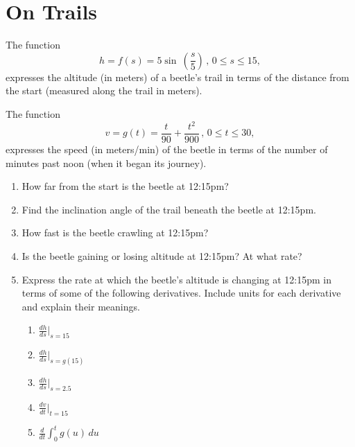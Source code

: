 \documentclass{ximera}
\begin{document}
\section{On Trails}

\begin{question} \label{QPPdreefr34}
The function
\[
  h = f(s)=5\sin\ \left(\frac{s}{5}\right)\, , \, 0\le s\leq 15,
\]
expresses the altitude (in meters) of a beetle's trail in terms of the distance from the start (measured along the trail in meters).

The function 
\[
     v = g(t) = \frac{t}{90} + \frac{t^2}{900} \, , \, 0\le t\leq 30,
\]
expresses the speed (in meters/min) of the beetle in terms of the number of minutes past noon (when it began its journey).

\begin{enumerate}

\item How far from the start is the beetle at 12:15pm?

\item Find the inclination angle of the trail beneath the beetle at 12:15pm.

\item How fast is the beetle crawling at 12:15pm?

\item Is the beetle gaining or losing altitude at 12:15pm? At what rate?

\item Express the rate at which the beetle's altitude is changing at 12:15pm in terms of some of the following derivatives. Include units for each derivative and explain their meanings.

\begin{enumerate}
    \item $\frac{dh}{ds}\Big|_{s=15}$
    \item $\frac{dh}{ds}\Big|_{s=g(15)}$
    \item $\frac{dh}{ds}\Big|_{s=2.5}$
    \item $\frac{dv}{dt}\Big|_{t=15}$
    \item $\frac{d}{dt} \int_0^t g(u)\,du$
\end{enumerate}
    
\end{enumerate}

\end{question}
\end{document}
